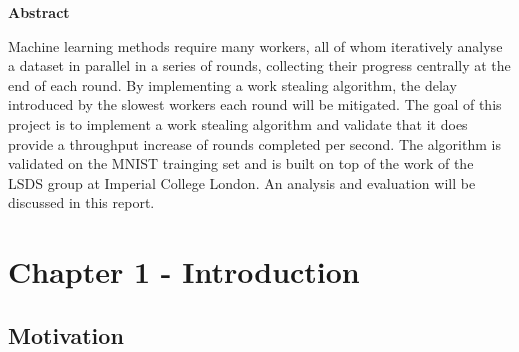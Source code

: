 \documentclass[12pt]{article}
\begin{document}
\vspace*{\fill}
\centerline{\large{\textbf{Abstract}}}
Machine learning methods require many workers, all of whom iteratively analyse a dataset in parallel in a series of rounds, collecting their progress centrally at the end of each round. By implementing a work stealing algorithm, the delay introduced by the slowest workers each round will be mitigated. The goal of this project is to implement a work stealing algorithm and validate that it does provide a throughput increase of rounds completed per second. The algorithm is validated on the MNIST trainging set and is built on top of the work of the LSDS group at Imperial College London. An analysis and evaluation will be discussed in this report.
\vspace*{\fill}

\newpage

\section{Chapter 1 - Introduction}

\subsection{Motivation}
\end{document}

